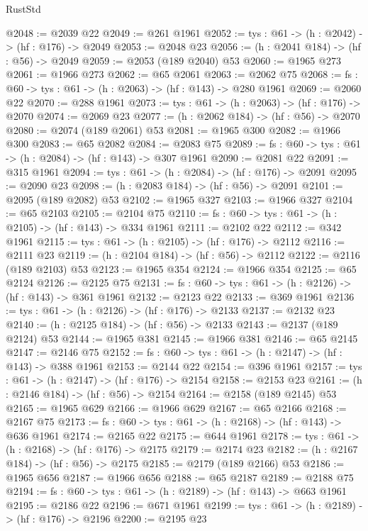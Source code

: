 \begin{lexlean}{RustStd}
\begin{coremodule}
@2048 := @2039 @22
@2049 := @261 @1961
@2052 := {tys : @61} -> (h : @2042) -> (hf : @176) -> @2049
@2053 := @2048 @23
@2056 := (h : @2041 @184) -> (hf : @56) -> @2049
@2059 := @2053 (@189 @2040) @53
@2060 := @1965 @273
@2061 := @1966 @273
@2062 := @65 @2061
@2063 := @2062 @75
@2068 := {fs : @60} -> {tys : @61} -> (h : @2063) -> (hf : @143) -> @280 @1961
@2069 := @2060 @22
@2070 := @288 @1961
@2073 := {tys : @61} -> (h : @2063) -> (hf : @176) -> @2070
@2074 := @2069 @23
@2077 := (h : @2062 @184) -> (hf : @56) -> @2070
@2080 := @2074 (@189 @2061) @53
@2081 := @1965 @300
@2082 := @1966 @300
@2083 := @65 @2082
@2084 := @2083 @75
@2089 := {fs : @60} -> {tys : @61} -> (h : @2084) -> (hf : @143) -> @307 @1961
@2090 := @2081 @22
@2091 := @315 @1961
@2094 := {tys : @61} -> (h : @2084) -> (hf : @176) -> @2091
@2095 := @2090 @23
@2098 := (h : @2083 @184) -> (hf : @56) -> @2091
@2101 := @2095 (@189 @2082) @53
@2102 := @1965 @327
@2103 := @1966 @327
@2104 := @65 @2103
@2105 := @2104 @75
@2110 := {fs : @60} -> {tys : @61} -> (h : @2105) -> (hf : @143) -> @334 @1961
@2111 := @2102 @22
@2112 := @342 @1961
@2115 := {tys : @61} -> (h : @2105) -> (hf : @176) -> @2112
@2116 := @2111 @23
@2119 := (h : @2104 @184) -> (hf : @56) -> @2112
@2122 := @2116 (@189 @2103) @53
@2123 := @1965 @354
@2124 := @1966 @354
@2125 := @65 @2124
@2126 := @2125 @75
@2131 := {fs : @60} -> {tys : @61} -> (h : @2126) -> (hf : @143) -> @361 @1961
@2132 := @2123 @22
@2133 := @369 @1961
@2136 := {tys : @61} -> (h : @2126) -> (hf : @176) -> @2133
@2137 := @2132 @23
@2140 := (h : @2125 @184) -> (hf : @56) -> @2133
@2143 := @2137 (@189 @2124) @53
@2144 := @1965 @381
@2145 := @1966 @381
@2146 := @65 @2145
@2147 := @2146 @75
@2152 := {fs : @60} -> {tys : @61} -> (h : @2147) -> (hf : @143) -> @388 @1961
@2153 := @2144 @22
@2154 := @396 @1961
@2157 := {tys : @61} -> (h : @2147) -> (hf : @176) -> @2154
@2158 := @2153 @23
@2161 := (h : @2146 @184) -> (hf : @56) -> @2154
@2164 := @2158 (@189 @2145) @53
@2165 := @1965 @629
@2166 := @1966 @629
@2167 := @65 @2166
@2168 := @2167 @75
@2173 := {fs : @60} -> {tys : @61} -> (h : @2168) -> (hf : @143) -> @636 @1961
@2174 := @2165 @22
@2175 := @644 @1961
@2178 := {tys : @61} -> (h : @2168) -> (hf : @176) -> @2175
@2179 := @2174 @23
@2182 := (h : @2167 @184) -> (hf : @56) -> @2175
@2185 := @2179 (@189 @2166) @53
@2186 := @1965 @656
@2187 := @1966 @656
@2188 := @65 @2187
@2189 := @2188 @75
@2194 := {fs : @60} -> {tys : @61} -> (h : @2189) -> (hf : @143) -> @663 @1961
@2195 := @2186 @22
@2196 := @671 @1961
@2199 := {tys : @61} -> (h : @2189) -> (hf : @176) -> @2196
@2200 := @2195 @23

\end{coremodule}
\end{lexlean}
